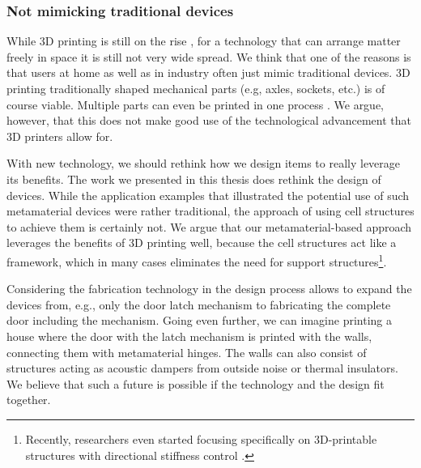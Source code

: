 \subsubsection{Not mimicking traditional devices}
While 3D printing is still on the rise \cite{Sclupteo2018}, for a technology that can arrange matter freely in space it is still not very wide spread. We think that one of the reasons is that users at home as well as in industry often just mimic traditional devices. 3D printing traditionally shaped mechanical parts (e.g, axles, sockets, etc.) is of course viable. Multiple parts can even be printed in one process \cite{Cali2012}. We argue, however, that this does not make good use of the technological advancement that 3D printers allow for.  

With new technology, we should rethink how we design items to really leverage its benefits. The work we presented in this thesis does rethink the design of devices. While the application examples that illustrated the potential use of such metamaterial devices were rather traditional, the approach of using cell structures to achieve them is certainly not. We argue that our metamaterial-based approach leverages the benefits of 3D printing well, because the cell structures act like a framework, which in many cases eliminates the need for support structures\footnote{Recently, researchers even started focusing specifically on 3D-printable structures with directional stiffness control \cite{Martinez2018}.}. 

Considering the fabrication technology in the design process allows to expand the devices from, e.g., only the door latch mechanism to fabricating the complete door including the mechanism. Going even further, we can imagine printing a house where the door with the latch mechanism is printed with the walls, connecting them with metamaterial hinges. The walls can also consist of structures acting as acoustic dampers from outside noise or thermal insulators. We believe that such a future is possible if the technology and the design fit together.



